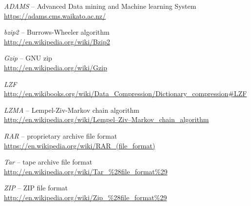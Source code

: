 %

\begin{thebibliography}{999}

		\textit{ADAMS} -- Advanced Data mining and Machine learning System \\
		\url{https://adams.cms.waikato.ac.nz/}{}
		
		\textit{bzip2} -- Burrows-Wheeler algorithm \\
		\url{http://en.wikipedia.org/wiki/Bzip2}{}
		
		\textit{Gzip} -- GNU zip \\
		\url{http://en.wikipedia.org/wiki/Gzip}{}
		
		\textit{LZF} \\
		\url{http://en.wikibooks.org/wiki/Data_Compression/Dictionary_compression#LZF}{}
		
		\textit{LZMA} -- Lempel-Ziv-Markov chain algorithm \\
		\url{http://en.wikipedia.org/wiki/Lempel–Ziv–Markov_chain_algorithm}{}

		\textit{RAR} -- proprietary archive file format \\
		\url{https://en.wikipedia.org/wiki/RAR_(file_format)}{}

		\textit{Tar} -- tape archive file format \\
		\url{http://en.wikipedia.org/wiki/Tar_\%28file_format\%29}{}
		
		\textit{ZIP} -- ZIP file format \\
		\url{http://en.wikipedia.org/wiki/Zip_\%28file_format\%29}{}

\end{thebibliography}
